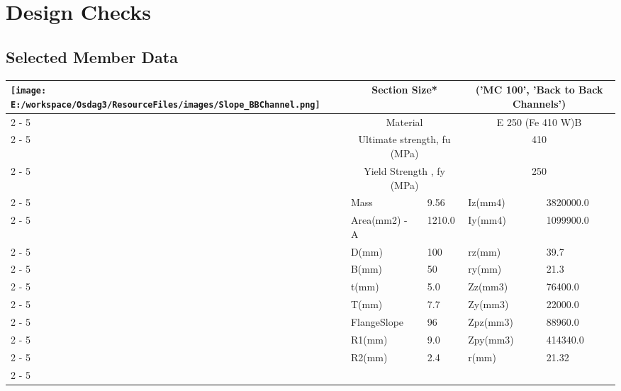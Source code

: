\documentclass{article}%
\begin{document}
%
%
\section{Design Checks}%
\label{sec:DesignChecks}%
\subsection{Selected Member Data}%
\label{subsec:SelectedMemberData}%
\renewcommand{\arraystretch}{1.2}%
\begin{longtable}{|p{5cm}|p{2cm}|p{2cm}|p{2cm}|p{5cm}|}%
\hline%
\hline%
\multirow{13}{*}{\texttt{[image: E:/workspace/Osdag3/ResourceFiles/images/Slope\_BBChannel.png]}}&\multicolumn{2}{|c|}{Section Size*}&\multicolumn{2}{|c|}{('MC 100', 'Back to Back Channels')}\\%
\cline{2%
-%
5}%
&\multicolumn{2}{|c|}{Material}&\multicolumn{2}{|c|}{E 250 (Fe 410 W)B}\\%
\cline{2%
-%
5}%
&\multicolumn{2}{|c|}{Ultimate strength, fu (MPa)}&\multicolumn{2}{|c|}{410}\\%
\cline{2%
-%
5}%
&\multicolumn{2}{|c|}{Yield Strength , fy (MPa)}&\multicolumn{2}{|c|}{250}\\%
\cline{2%
-%
5}%
&Mass&9.56&Iz(mm4)&3820000.0\\%
\cline{2%
-%
5}%
&Area(mm2) {-} A&1210.0&Iy(mm4)&1099900.0\\%
\cline{2%
-%
5}%
&D(mm)&100&rz(mm)&39.7\\%
\cline{2%
-%
5}%
&B(mm)&50&ry(mm)&21.3\\%
\cline{2%
-%
5}%
&t(mm)&5.0&Zz(mm3)&76400.0\\%
\cline{2%
-%
5}%
&T(mm)&7.7&Zy(mm3)&22000.0\\%
\cline{2%
-%
5}%
&FlangeSlope&96&Zpz(mm3)&88960.0\\%
\cline{2%
-%
5}%
&R1(mm)&9.0&Zpy(mm3)&414340.0\\%
\cline{2%
-%
5}%
&R2(mm)&2.4&r(mm)&21.32\\%
\cline{2%
-%
5}%
\hline%
\end{longtable}

%
\newpage%
\end{document}
